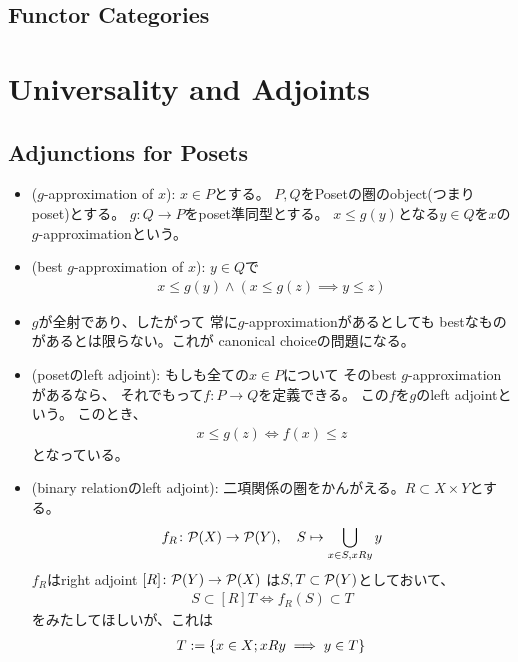 \documentclass[9pt]{ltjsarticle}
\begin{document}
\subsection{Functor Categories}
\label{sub:Functor Categories}

\section{Universality and Adjoints}
\label{sec:Universality and Adjoints}
\subsection{Adjunctions for Posets}
\label{sub:Adjunctions for Posets}
\begin{itemize}
  \item ($g$-approximation of $x$):
  $x\in P$とする。
  $P,Q$をPosetの圏のobject(つまりposet)とする。
  $g\colon Q\to P$をposet準同型とする。
  $x\le g(y)$となる$y\in Q$を$x$の
  $g$-approximationという。
  \item (best $g$-approximation of $x$):
  $y\in Q$で
  \begin{align}
    x\le g(y) \land (x\le g(z) \implies y\le z)
  \end{align}
  \item
  $g$が全射であり、したがって
  常に$g$-approximationがあるとしても
  bestなものがあるとは限らない。これが
  canonical choiceの問題になる。
  \item (posetのleft adjoint):
  もしも全ての$x\in P$について
  そのbest $g$-approximationがあるなら、
  それでもって$f\colon P\to Q$を定義できる。
  この$f$を$g$のleft adjointという。
  このとき、
  \begin{align}
    x\le g(z)\iff f(x)\le z
  \end{align}
  となっている。
  \item (binary relationのleft adjoint):
  二項関係の圏をかんがえる。$R\subset X\times Y$とする。
  \begin{align}
    f_R\colon \cal P(X)\to \cal P(Y),\quad
    S\mapsto \bigcup_{x\in S, xRy}y
  \end{align}
  $f_R$はright adjoint $[R]\colon \cal P(Y)\to \cal P(X)$
  は$S,T\subset \cal P(Y)$としておいて、
  \begin{align}
    S\subset [R]T \iff f_R(S)\subset T
  \end{align}
  をみたしてほしいが、これは
  \begin{align}
    [R]T
    \defeq
    \set{x\in X; xRy \implies y\in T}
  \end{align}

\end{itemize}
\end{document}
